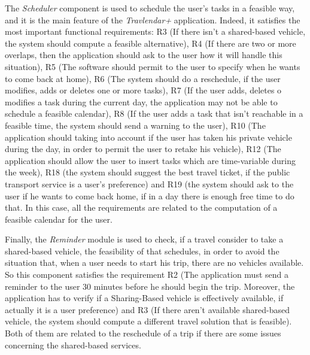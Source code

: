 The \emph{Scheduler} component is used to schedule the user's tasks in a feasible way, and it is the main feature of the \emph{Travlendar+} application. Indeed, it satisfies the most important functional requirements: R3 (If there isn't a shared-based vehicle, the system should compute a feasible alternative), R4 (If there are two or more overlaps, then the application should ask to the user how it will handle this situation), R5 (The software should permit to the user to specify when he wants to come back at home), R6 (The system should do a reschedule, if the user modifies, adds or deletes one or more tasks), R7 (If the user adds, deletes o modifies a task during the current day, the application may not be able to schedule a feasible calendar), R8 (If the user adds a task that isn't reachable in a feasible time, the system should send a warning to the user), R10 (The application should taking into account if the user has taken his private vehicle during the day, in order to permit the user to retake his vehicle), R12 (The application should allow the user to insert tasks which are time-variable during the week), R18 (the system should suggest the best travel ticket, if the public transport service is a user's preference) and R19 (the system should ask to the user if he wants to come back home, if in a day there is enough free time to do that. In this case, all the requirements are related to the computation of a feasible calendar for the user.

Finally, the \emph{Reminder} module is used to check, if a travel consider to take a shared-based vehicle, the feasibility of that schedules, in order to avoid the situation that, when a user needs to start his trip, there are no vehicles available. So this component satisfies the requirement R2 (The  application  must  send  a  reminder  to  the  user  30  minutes  before  he  should begin the trip.  Moreover, the application has to verify if a Sharing-Based vehicle is effectively available, if actually it is a user preference) and R3 (If there aren't available shared-based vehicle, the system should compute a different travel solution that is feasible). Both of them are related to the reschedule of a trip if there are some issues concerning the shared-based services.